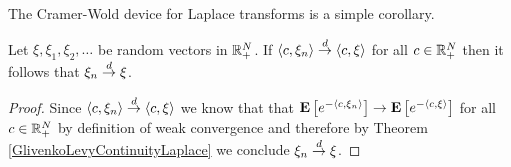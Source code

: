 The Cramer-Wold device for Laplace transforms is a simple corollary.
\begin{cor}\label{CramerWoldDeviceLaplace}Let $\xi, \xi_1, \xi_2, \dotsc$ be 
  random vectors in $\mathbb{R}^N_+$.  If $\langle c, \xi_n \rangle
  \overset{d}\to \langle c, \xi \rangle$ for all $c \in \mathbb{R}^N_+$ then it
  follows that $\xi_n \overset{d}\to \xi$.
\end{cor}
\begin{proof}
Since  $\langle c, \xi_n \rangle  \overset{d}\to \langle c, \xi \rangle$ we
know that that $\textbf{E}\left[e^{-\langle c, \xi_n \rangle } \right] \to
\textbf{E}\left[e^{-\langle c, \xi \rangle}\right]$ for all $c \in \mathbb{R}^N_+$
by definition of weak convergence
and therefore by Theorem \ref{GlivenkoLevyContinuityLaplace} we
conclude $\xi_n \overset{d}\to \xi$.
\end{proof}